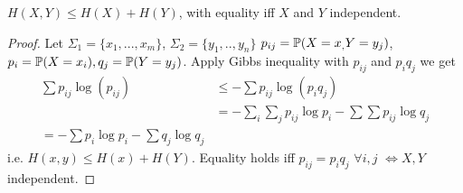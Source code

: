 \documentclass[a4paper]{article}
\begin{document}
\begin{lemma}
$H(X,Y) \leq H(X) + H(Y)$, with equality iff $X$ and $Y$ independent.
\begin{proof}
Let $\Sigma_1 = \{x_1,...,x_m\}$, $\Sigma_2 = \{y_1,..,y_n\}$ $p_{ij} = \P(X=x_,Y=y_j)$, $p_i = \P(X=x_i), q_j = \P(Y=y_j)$. Apply Gibbs inequality with $p_{ij}$ and $p_i q_j$ we get
\begin{equation*}
\begin{aligned}
\sum p_{ij} \log (p_{ij}) & \leq -\sum p_{ij} \log (p_i q_j)\\
&= -\sum_i \sum_j p_{ij} \log p_i - \sum\sum p_{ij} \log q_j\\
= -\sum p_i \log p_i - \sum q_j \log q_j
\end{aligned}
\end{equation*}
i.e. $H(x,y) \leq H(x) + H(Y)$. Equality holds iff $p_{ij} = p_i q_j$ $\forall i,j$ $\iff X,Y$ independent.
\end{proof}
\end{lemma}

\end{document}
